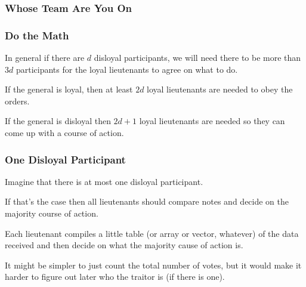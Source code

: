 \begin{frame}
	\frametitle{Whose Team Are You On}

	\begin{center}
	\end{center}

\end{frame}

\begin{frame}
	\frametitle{Do the Math}

	In general if there are $d$ disloyal participants, we will need there to be more than $3d$ participants for the loyal lieutenants to agree on what to do.

	If the general is loyal, then at least $2d$ loyal lieutenants are needed to obey the orders.

	If the general is disloyal then $2d+1$ loyal lieutenants are needed so they can come up with a course of action.

\end{frame}


\begin{frame}
	\frametitle{One Disloyal Participant}

	Imagine that there is at most one disloyal participant.

	If that's the case then all lieutenants should compare notes and decide on the majority course of action.

	Each lieutenant compiles a little table (or array or vector, whatever) of the data received and then decide on what the majority cause of action is.

	It might be simpler to just count the total number of votes, but it would make it harder to figure out later who the traitor is (if there is one).

\end{frame}


